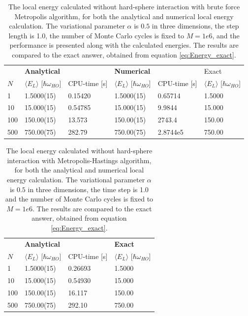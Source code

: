 \documentclass[norsk,a4paper,12pt]{article}
\begin{document}
\begin{table} [H]
	\centering
	\caption{The local energy calculated without hard-sphere interaction with brute force Metropolis algorithm, for both the analytical and numerical local energy calculation. The variational parameter $\alpha$ is $0.5$ in three dimensions, the step length is 1.0, the number of Monte Carlo cycles is fixed to $M=1e6$, and the performance is presented along with the calculated energies. The results are compared to the exact answer, obtained from equation \ref{eq:Energy_exact}.}
	\begin{tabularx}{\textwidth}{X|XX|XX|X} \hline
		\label{tab:BFmet}
		& \multicolumn{2}{X}{\textbf{Analytical}} & \multicolumn{2}{X}{\textbf{Numerical}} & Exact \\
		$N$ & $\langle E_L\rangle$ [$\hbar\omega_{HO}$] & CPU-time [s] & $\langle E_L\rangle$ [$\hbar\omega_{HO}$] & CPU-time [s]& $\langle E_L\rangle$ [$\hbar\omega_{HO}$]\\ \hline
		1 & 1.5000(15) & 0.15420 & 1.5000(15) & 0.65714 & 1.5000\\
		10 & 15.000(15) & 0.54785 & 15.000(15) & 9.9844 & 15.000\\
		100 & 150.00(15) & 13.573 & 150.00(15) & 2743.4 & 150.00\\
		500 & 750.00(75) & 282.79 & 750.00(75) & 2.8744e5 & 750.00\\ \hline
	\end{tabularx}
\end{table}

\begin{table} [H]
	\centering
	\caption{The local energy calculated without hard-sphere interaction with Metropolis-Hastings algorithm, for both the analytical and numerical local energy calculation. The variational parameter $\alpha$ is $0.5$ in three dimensions, the time step is 1.0 and the number of Monte Carlo cycles is fixed to $M=1e6$. The results are compared to the exact answer, obtained from equation \ref{eq:Energy_exact}.}
	\begin{tabularx}{\textwidth}{X|XX|X} \hline
		\label{tab:ISmet}
		& \textbf{Analytical}  & & \textbf{Exact}\\
		$N$ & $\langle E_L\rangle$ [$\hbar\omega_{HO}$] & CPU-time [s] & $\langle E_L\rangle$ [$\hbar\omega_{HO}$]\\ \hline
		1 & 1.5000(15) & 0.26693  & 1.5000 \\
		10 & 15.000(15) &  0.54930 & 15.000 \\
		100 & 150.00(15) & 16.117 & 150.00 \\
		500 & 750.00(75) & 292.10 & 750.00 \\ \hline
	\end{tabularx}
\end{table}
\end{document}
